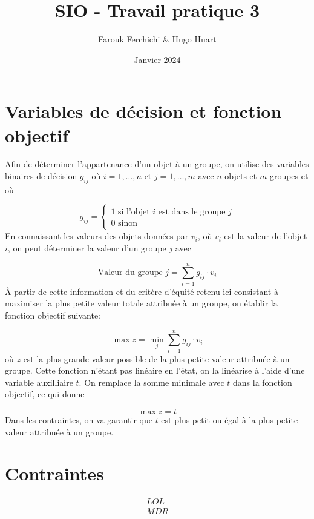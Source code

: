 \documentclass[12pt]{article}
\title{SIO - Travail pratique 3}
\date{Janvier 2024}
\author{Farouk Ferchichi \& Hugo Huart}
\begin{document}
\maketitle

\section{Variables de décision et fonction objectif}

Afin de déterminer l'appartenance d'un objet à un groupe,
on utilise des variables binaires de décision $g_{ij}$ où $i=1,\dots,n \text{ et } j=1,\dots,m$
avec $n$ objets et $m$ groupes et où

\[
    g_{ij} =
    \begin{cases}
    1 \text{ si l'objet } i \text{ est dans le groupe } j  \\
    0 \text{ sinon}
    \end{cases}
\]
%
En connaissant les valeurs des objets données par $v_i$, où $v_i$ est la valeur de l'objet $i$, on
peut déterminer la valeur d'un groupe $j$ avec

\[
    \text{Valeur du groupe } j = \sum_{i=1}^{n}g_{ij} \cdot v_i
\]
%
À partir de cette information et du critère d'équité retenu ici consistant à maximiser
la plus petite valeur totale attribuée à un groupe, on établir la fonction objectif suivante:

\[
    \max z = \min_{j} \sum_{i=1}^{n}g_{ij} \cdot v_i
\]
%
où $z$ est la plus grande valeur possible de la plus petite valeur attribuée à un groupe.
Cette fonction n'étant pas linéaire en l'état, on la linéarise à l'aide d'une
variable auxilliaire $t$. On remplace la somme minimale avec $t$ dans la fonction objectif, ce qui
donne

\[
    \max z = t
\]
%
Dans les contraintes, on va garantir que $t$ est plus petit ou égal à la plus petite valeur
attribuée à un groupe.

\section{Contraintes}

\begin{align}
    \tag{1} LOL \\
    \tag{2} MDR
\end{align}
\end{document}
